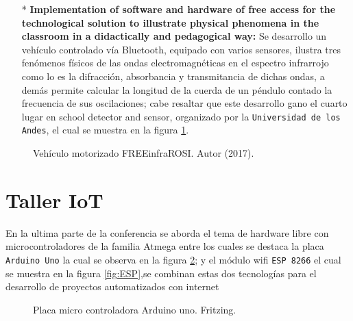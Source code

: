 \documentclass[jou]{apa6} %
\begin{document}
\begin{enumerate}
\item[*] \textbf{Implementation of software and hardware of free access for the technological solution to illustrate physical phenomena in the classroom in a didactically and pedagogical way: }Se desarrollo un vehículo controlado vía Bluetooth, equipado con varios sensores, ilustra tres fenómenos físicos de las ondas electromagnéticas en el espectro infrarrojo  como lo es la difracción, absorbancia y transmitancia de dichas ondas, a demás permite calcular la longitud de la cuerda de un péndulo contado la frecuencia de sus oscilaciones; cabe resaltar que este desarrollo gano el cuarto lugar en school detector and sensor, organizado por la \texttt{Universidad de los Andes}, el cual se muestra en la figura \ref{fig:carro}. 
\end{enumerate}

\begin{figure}[htb]
  \centering
\setlength\fboxsep{0pt}
\setlength\fboxrule{0.5pt}
  \caption{\footnotesize Vehículo motorizado FREEinfraROSI. Autor (2017).}
  \label{fig:carro}  
\end{figure}

\section{Taller IoT}
En la ultima parte de la conferencia se aborda el tema de hardware libre con microcontroladores de la familia Atmega entre los cuales se destaca la placa \texttt{Arduino Uno} la cual se observa en la figura \ref{fig:Arduino}; y el módulo wifi \texttt{ESP 8266} el cual se muestra en la figura \ref{fig:ESP},se combinan estas dos tecnologías para el desarrollo de proyectos automatizados con internet
\\
\begin{figure}[htb]
  \centering
\setlength\fboxsep{0pt}
\setlength\fboxrule{0.5pt}
  \caption{\footnotesize Placa micro controladora Arduino uno. Fritzing.}
  \label{fig:Arduino}  
\end{figure}
\end{document}
